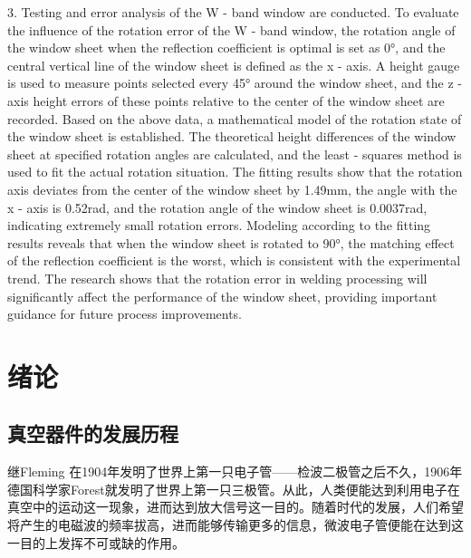 \documentclass[master]{thesis-uestc}
\begin{document}
\begin{englishabstract}
3. Testing and error analysis of the W - band window are conducted. To evaluate the influence of the rotation error of the W - band window, the rotation angle of the window sheet when the reflection coefficient is optimal is set as 0°, and the central vertical line of the window sheet is defined as the x - axis. A height gauge is used to measure points selected every 45° around the window sheet, and the z - axis height errors of these points relative to the center of the window sheet are recorded. Based on the above data, a mathematical model of the rotation state of the window sheet is established. The theoretical height differences of the window sheet at specified rotation angles are calculated, and the least - squares method is used to fit the actual rotation situation. The fitting results show that the rotation axis deviates from the center of the window sheet by 1.49mm, the angle with the x - axis is 0.52rad, and the rotation angle of the window sheet is 0.0037rad, indicating extremely small rotation errors. Modeling according to the fitting results reveals that when the window sheet is rotated to 90°, the matching effect of the reflection coefficient is the worst, which is consistent with the experimental trend. The research shows that the rotation error in welding processing will significantly affect the performance of the window sheet, providing important guidance for future process improvements.

\end{englishabstract}

\thesistableofcontents %



\chapter{绪\hspace{6pt}论}
\section{真空器件的发展历程}
继Fleming 在1904年发明了世界上第一只电子管——检波二极管之后不久，1906年德国科学家Forest就发明了世界上第一只三极管。从此，人类便能达到利用电子在真空中的运动这一现象，进而达到放大信号这一目的。随着时代的发展，人们希望将产生的电磁波的频率拔高，进而能够传输更多的信息，微波电子管便能在达到这一目的上发挥不可或缺的作用。
\end{document}
